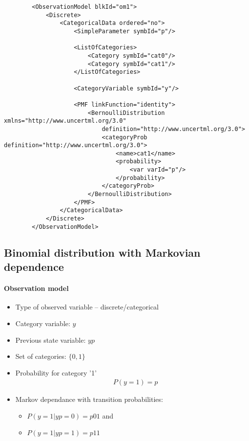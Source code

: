 \lstset{language=XML}
\begin{lstlisting}
        <ObservationModel blkId="om1">
            <Discrete>
                <CategoricalData ordered="no">
                    <SimpleParameter symbId="p"/>
                    
                    <ListOfCategories> 
                        <Category symbId="cat0"/>
                        <Category symbId="cat1"/>
                    </ListOfCategories>
                    
                    <CategoryVariable symbId="y"/>
                    
                    <PMF linkFunction="identity">
                        <BernoulliDistribution xmlns="http://www.uncertml.org/3.0" 
                            definition="http://www.uncertml.org/3.0">
                            <categoryProb definition="http://www.uncertml.org/3.0">
                                <name>cat1</name>
                                <probability>
                                    <var varId="p"/>
                                </probability>
                            </categoryProb>
                        </BernoulliDistribution>
                    </PMF>
                </CategoricalData>
            </Discrete>
        </ObservationModel>
\end{lstlisting}


\subsection{Binomial distribution with Markovian dependence}

\paragraph{Observation model}

\begin{itemize}
\item
Type of observed variable -- discrete/categorical
\item
Category variable: $y$
\item
Previous state variable: $yp$
\item
Set of categories: $\{0,1\}$
\item
Probability for category '1'
\begin{align}
& P(y=1) = p \nonumber
\end{align}
\item
Markov dependance with transition probabilities:
\begin{itemize}
\item
$P(y=1 | yp=0) = p01$ and 
\item
$P(y=1 | yp=1) = p11$
\end{itemize}
\end{itemize}

